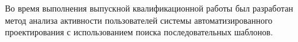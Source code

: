 
Во время выполнения выпускной квалификационной работы был разработан метод анализа активности пользователей системы автоматизированного проектирования с использованием поиска последовательных шаблонов.